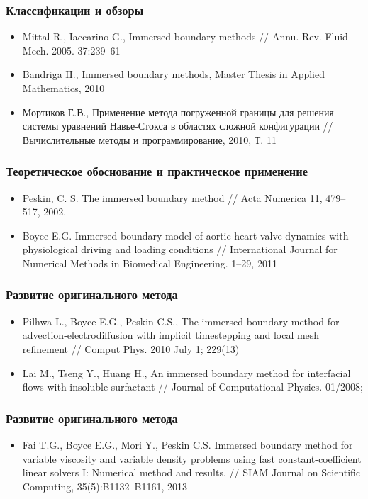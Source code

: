 \documentclass[14pt]{beamer}
\begin{document}
\begin{frame}
\frametitle{Классификации и обзоры}
\begin{itemize}
    \item Mittal R., Iaccarino G., Immersed boundary methods // Annu. Rev. Fluid Mech. 2005. 37:239–61
    \item Bandriga H., Immersed boundary methods, Master Thesis in Applied Mathematics, 2010
    \item Мортиков Е.В., Применение метода погруженной границы для решения системы уравнений Навье-Стокса в областях сложной конфигурации // Вычислительные методы и программирование, 2010, Т. 11
\end{itemize}
\end{frame}

\begin{frame}
\frametitle{Теоретическое обоснование и практическое применение}
\begin{itemize}
    \item Peskin, C. S. The immersed boundary method // Acta Numerica 11, 479–517, 2002.
    \item Boyce E.G. Immersed boundary model of aortic heart valve dynamics with physiological driving and loading conditions // International Journal for Numerical Methods in Biomedical Engineering. 1–29, 2011
\end{itemize}
\end{frame}



\begin{frame}
\frametitle{Развитие оригинального метода}
\begin{itemize}
    \item Pilhwa L., Boyce E.G., Peskin C.S., The immersed boundary method for advection-electrodiffusion with implicit timestepping and local mesh refinement // Comput Phys. 2010 July 1; 229(13)
    \item Lai M., Tseng Y., Huang H., An immersed boundary method for interfacial flows with insoluble surfactant // Journal of Computational Physics. 01/2008; 
\end{itemize}
\end{frame}

\begin{frame}
\frametitle{Развитие оригинального метода}
\begin{itemize}
    \item Fai T.G., Boyce E.G., Mori Y., Peskin C.S. Immersed boundary method for variable viscosity and variable density problems using fast constant-coefficient linear solvers I: Numerical method and results. // SIAM Journal on Scientific Computing, 35(5):B1132–B1161, 2013
\end{itemize}
\end{frame}
\end{document}
